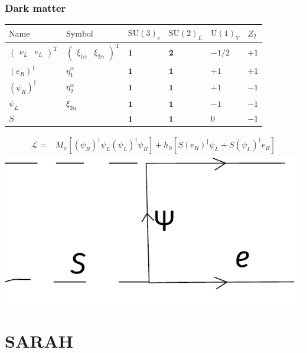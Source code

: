 \documentclass[%
xcolor=dvipsnames,table%
]{beamer}
\begin{document}
\begin{frame}
  \frametitle{Dark matter}
   \begin{tabular}{llllll}
 $\text{Name}$ & $\text{Symbol}$ & $\text{SU}(3)_c$ & $\text{SU}(2)_L $& $\text{U}(1)_Y$ & $Z_2$ \\ \hline
 $\begin{pmatrix}\nu_L  &  e_L\end{pmatrix}^{\operatorname{T}}$ & $
\begin{pmatrix}\xi_{1\alpha}  &  \xi_{2\alpha} \end{pmatrix}^{\operatorname{T}}$ & $ \mathbf{1} $ & $ \mathbf{2} $ & $ -1/2 $ & $ +1$\\
$(e_R)^{\dagger} $ & $ \eta^{\alpha}_1 $ & $ \mathbf{1} $ & $ \mathbf{1} $ & $ +1 $ & $ +1$ \\
$(\psi_R)^{\dagger} $ & $ \eta^{\alpha}_2 $ & $ \mathbf{1} $ & $ \mathbf{1} $ & $ +1 $ & $ -1$ \\
$\psi_L $ & $ \xi_{3\alpha} $ & $ \mathbf{1} $ & $ \mathbf{1} $ & $ -1 $ & $ -1$ \\
$S$ &  & $ \mathbf{1} $ & $ \mathbf{1} $ & $ 0 $ & $ -1$ \\
 \end{tabular}

 \begin{align}
   \mathcal{L}=& M_{\psi} \left[ \left( \psi_R \right)^{\dagger} \psi_L
\left( \psi_L \right)^{\dagger} \psi_R \right]
+ h_S \left[ S \left(e_R  \right)^{\dagger} \psi_L 
+ S \left( \psi_L \right)^{\dagger}e_R 
\right]
 \end{align}
\includegraphics[scale=0.5]{fp}

\end{frame}

\section{SARAH}
\end{document}
